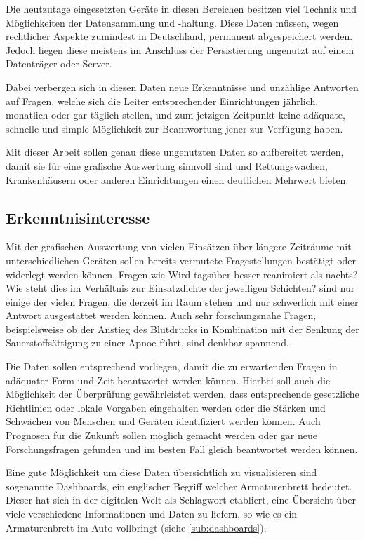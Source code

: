 Die heutzutage eingesetzten Geräte in diesen Bereichen besitzen viel Technik und Möglichkeiten der Datensammlung und -haltung.
Diese Daten müssen, wegen rechtlicher Aspekte zumindest in Deutschland, permanent abgespeichert werden.
Jedoch liegen diese meistens im Anschluss der Persistierung ungenutzt auf einem Datenträger oder Server.

Dabei verbergen sich in diesen Daten neue Erkenntnisse und unzählige Antworten auf Fragen, welche sich die Leiter entsprechender Einrichtungen jährlich, monatlich oder gar täglich stellen, und zum jetzigen Zeitpunkt keine adäquate, schnelle und simple Möglichkeit zur Beantwortung jener zur Verfügung haben.

Mit dieser Arbeit sollen genau diese ungenutzten Daten so aufbereitet werden, damit sie für eine grafische Auswertung sinnvoll sind und Rettungswachen, Krankenhäusern oder anderen Einrichtungen einen deutlichen Mehrwert bieten.

\subsection{Erkenntnisinteresse}
\label{erkenntnis}
Mit der grafischen Auswertung von vielen Einsätzen über längere Zeiträume mit unterschiedlichen Geräten sollen bereits vermutete Fragestellungen bestätigt oder widerlegt werden können.
Fragen wie \glqq Wird tagsüber besser reanimiert als nachts? Wie steht dies im Verhältnis zur Einsatzdichte der jeweiligen Schichten?\grqq{} sind nur einige der vielen Fragen, die derzeit im Raum stehen und nur schwerlich mit einer Antwort ausgestattet werden können.
Auch sehr forschungsnahe Fragen, beispielsweise ob der Anstieg des Blutdrucks in Kombination mit der Senkung der Sauerstoffsättigung zu einer Apnoe führt, sind denkbar spannend.

Die Daten sollen entsprechend vorliegen, damit die zu erwartenden Fragen in adäquater Form und Zeit beantwortet werden können.
Hierbei soll auch die Möglichkeit der Überprüfung gewährleistet werden, dass entsprechende gesetzliche Richtlinien \cite{Maconochie.2015} oder lokale Vorgaben eingehalten werden oder die Stärken und Schwächen von Menschen und Geräten identifiziert werden können.
Auch Prognosen für die Zukunft sollen möglich gemacht werden oder gar neue Forschungsfragen gefunden  und im besten Fall gleich beantwortet werden können.

Eine gute Möglichkeit um diese Daten übersichtlich zu visualisieren sind sogenannte \glqq \gls{Dashboard}s\grqq, ein englischer Begriff welcher \glqq Armaturenbrett\grqq{} bedeutet.
Dieser hat sich in der digitalen Welt als Schlagwort etabliert, eine Übersicht über viele verschiedene Informationen und Daten zu liefern, so wie es ein Armaturenbrett im Auto vollbringt (siehe \ref{sub:dashboards}).

